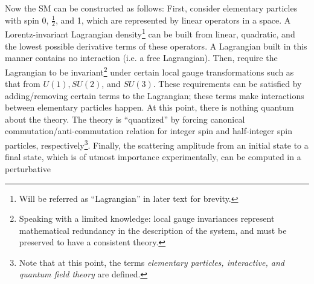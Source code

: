 Now the SM can be constructed as follows:
First, consider elementary particles with spin 0, $\frac{1}{2}$, and 1,
which are represented by linear operators in a space.
A Lorentz-invariant Lagrangian density\footnote{
    Will be referred as ``Lagrangian'' in later text for brevity.
} can be built from
linear, quadratic, and the lowest possible derivative terms of these
operators.
A Lagrangian built in this manner contains no interaction (i.e. a free
Lagrangian).
Then, require the Lagrangian to be invariant\footnote{
    Speaking with a limited knowledge: local gauge invariances represent
    mathematical redundancy in the description of the system,
    and must be preserved to have a consistent theory.
} under certain local gauge transformations
such as that from $U(1), SU(2)$, and $SU(3)$.
These requirements can be satisfied by adding/removing certain terms to the
Lagrangian;
these terms make interactions between elementary particles happen.
At this point, there is nothing quantum about the theory.
The theory is ``quantized'' by forcing canonical commutation/anti-commutation
relation for integer spin and half-integer spin particles,
respectively\footnote{
    Note that at this point, the terms
    \emph{elementary particles, interactive, and quantum field theory}
    are defined.
}.
Finally, the scattering amplitude from an initial state to a final state,
which is of utmost importance experimentally,
can be computed in a perturbative
